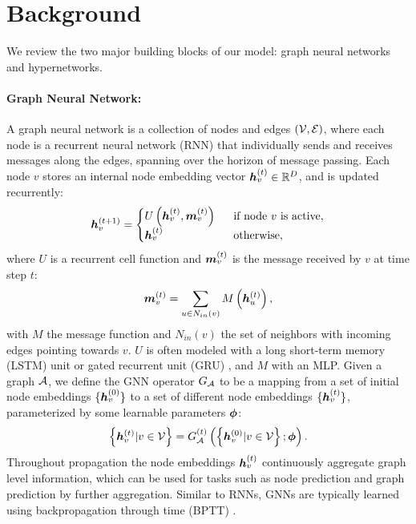\section{Background}
We review the two major building blocks of our model: graph neural networks and hypernetworks.

\paragraph{Graph Neural Network:}
A graph neural network \citep{ScarselliGTHM09,li2015gated,KipfW16} is a collection of nodes and
edges $({\mathcal{V}}, {\mathcal{E}})$, where each node is a recurrent neural network (RNN) that individually sends and
receives messages along the edges, spanning over the horizon of message passing. Each node $v$
stores an internal node embedding vector ${\bm{h}}_v^{(t)} \in \mathbb{R}^D$, and is updated recurrently:
\begin{equation}
\label{eq:gnn_prop}
{\bm{h}}_v^{(t+1)} = 
\begin{cases}
U \left({\bm{h}}_v^{(t)}, {\bm{m}}_v^{(t)} \right) \ \ & \text{if node $v$ is active},\\
{\bm{h}}_v^{(t)} \ \ & \text{otherwise},
\end{cases}
\end{equation}
where $U$ is a recurrent cell function and ${\bm{m}}_v^{(t)}$ is the message received by $v$ at time step
$t$:
\begin{equation}
{\bm{m}}_v^{(t)}=\sum_{u\in N_{in}(v)} M \left({\bm{h}}_u^{(t)} \right),
\end{equation}
with $M$ the message function and $N_{in}(v)$ the set of neighbors with incoming edges
pointing towards $v$. $U$ is often modeled with a long short-term memory (LSTM) unit
\citep{hochreiter97lstm} or gated recurrent unit (GRU) \citep{cho14gru}, and $M$ with an MLP. Given
a graph ${\mathcal{A}}$, we define the GNN operator $G_{\mathcal{A}}$ to be a mapping from a set of initial node
embeddings $\{{\bm{h}}_v^{(0)}\}$ to a set of different node embeddings $\{{\bm{h}}_v^{(t)}\}$, parameterized by
some learnable parameters ${\bm{\phi}}$:
\begin{equation}
\left\{{\bm{h}}_v^{(t)} | v \in {\mathcal{V}}\right\} = 
G_{\mathcal{A}}^{(t)} \left(\left\{{\bm{h}}_v^{(0)} | v \in {\mathcal{V}} \right\}; {\bm{\phi}} \right).
\end{equation}
Throughout propagation the node embeddings ${\bm{h}}_v^{(t)}$ continuously aggregate graph level
information, which  can be used for tasks such as node prediction and   graph prediction by further
aggregation. Similar to RNNs, GNNs are typically learned using backpropagation through time (BPTT)
\citep{bptt}.

